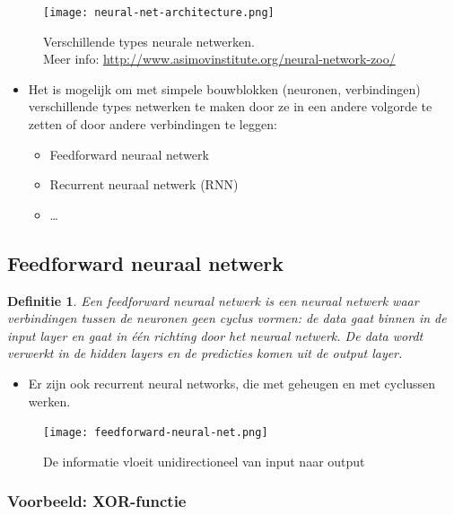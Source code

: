 \documentclass{article}
\newtheorem{theorem}{Definitie}[section]
\begin{document}
\begin{figure}[H]
    \centering
    \texttt{[image: neural-net-architecture.png]}
    \caption{Verschillende types neurale netwerken.\\ Meer info: \url{http://www.asimovinstitute.org/neural-network-zoo/}}
\end{figure}

\begin{itemize}
    \item Het is mogelijk om met simpele bouwblokken (neuronen, verbindingen) verschillende types netwerken te maken door ze in een andere volgorde te zetten of door andere verbindingen te leggen:
    \begin{itemize}
        \item Feedforward neuraal netwerk 
        \item Recurrent neuraal netwerk (RNN) 
        \item \dots
    \end{itemize}
\end{itemize}

\subsection{Feedforward neuraal netwerk}

\begin{theorem}
    Een feedforward neuraal netwerk is een neuraal netwerk waar verbindingen tussen de 
    neuronen geen cyclus vormen: de data gaat binnen in de input layer en gaat in één richting 
    door het neuraal netwerk. De data wordt verwerkt in de hidden layers en de predicties
    komen uit de output layer.
\end{theorem}

\begin{itemize}
    \item Er zijn ook recurrent neural networks, die met geheugen en met cyclussen werken.
\end{itemize}

\begin{figure}[H]
    \centering
    \texttt{[image: feedforward-neural-net.png]}
    \caption{De informatie vloeit unidirectioneel van input naar output}
\end{figure}

\subsubsection{Voorbeeld: XOR-functie}
\end{document}
